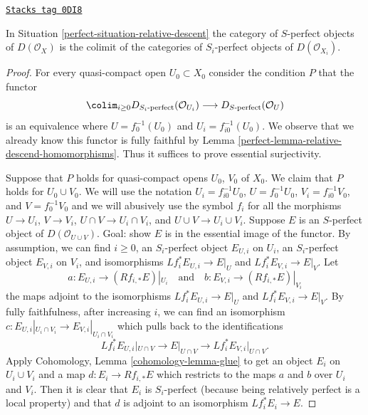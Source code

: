 \begin{lemma}
\label{perfect-lemma-descend-relatively-perfect}
\href{https://stacks.math.columbia.edu/tag/0DI8}{\texttt{Stacks tag 0DI8}}

In Situation \ref{perfect-situation-relative-descent} the category of
$S$-perfect objects of $D(\mathcal{O}_X)$ is the colimit of the categories
of $S_i$-perfect objects of $D(\mathcal{O}_{X_i})$.
\end{lemma}

\begin{proof}

For every quasi-compact open $U_0 \subset X_0$ consider the condition $P$
that the functor
$$
\colim_{i \geq 0} D_{S_i\text{-perfect}}(\mathcal{O}_{U_i})
\longrightarrow
D_{S\text{-perfect}}(\mathcal{O}_U)
$$
is an equivalence where $U = f_0^{-1}(U_0)$ and $U_i = f_{i0}^{-1}(U_0)$.
We observe that we already know this functor is fully faithful
by Lemma \ref{perfect-lemma-relative-descend-homomorphisms}. Thus it suffices to prove
essential surjectivity.

\medskip\noindent
Suppose that $P$ holds for quasi-compact opens $U_0$, $V_0$ of $X_0$.
We claim that $P$ holds for $U_0 \cup V_0$. We will use the notation
$U_i = f_{i0}^{-1}U_0$, $U = f_0^{-1}U_0$, $V_i = f_{i0}^{-1}V_0$,
and $V = f_0^{-1}V_0$ and we will abusively use the symbol
$f_i$ for all the morphisms $U \to U_i$, $V \to V_i$,
$U \cap V \to U_i \cap V_i$, and $U \cup V \to U_i \cup V_i$.
Suppose $E$ is an $S$-perfect object of $D(\mathcal{O}_{U \cup V})$.
Goal: show $E$ is in the essential image of the functor.
By assumption,
we can find $i \geq 0$, an $S_i$-perfect object $E_{U, i}$ on $U_i$,
an $S_i$-perfect object $E_{V, i}$ on $V_i$, and
isomorphisms $Lf_i^*E_{U, i} \to E|_U$ and $Lf_i^*E_{V, i} \to E|_V$.
Let
$$
a : E_{U, i} \to (Rf_{i, *}E)|_{U_i}
\quad\text{and}\quad
b : E_{V, i} \to (Rf_{i, *}E)|_{V_i}
$$
the maps adjoint to the isomorphisms $Lf_i^*E_{U, i} \to E|_U$
and $Lf_i^*E_{V, i} \to E|_V$.
By fully faithfulness, after increasing $i$,
we can find an isomorphism
$c : E_{U, i}|_{U_i \cap V_i} \to E_{V, i}|_{U_i \cap V_i}$
which pulls back to the identifications
$$
Lf_i^*E_{U, i}|_{U \cap V} \to E|_{U \cap V} \to Lf_i^*E_{V, i}|_{U \cap V}.
$$
Apply Cohomology, Lemma \ref{cohomology-lemma-glue}
to get an object $E_i$ on $U_i \cup V_i$ and a map $d : E_i \to Rf_{i, *}E$
which restricts to the maps $a$ and $b$ over $U_i$ and $V_i$.
Then it is clear that $E_i$ is $S_i$-perfect (because being
relatively perfect is a local property) and that
$d$ is adjoint to an isomorphism $Lf_i^*E_i \to E$.


\end{proof}
